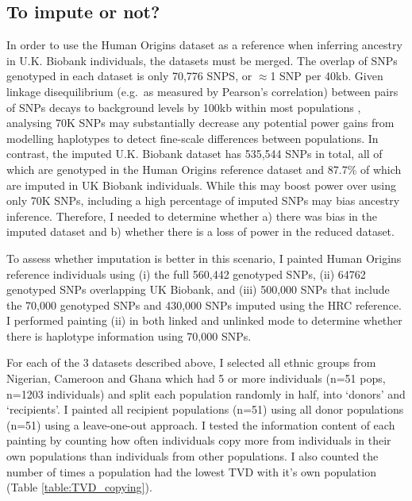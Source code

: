 
\subsection{To impute or not?}

In order to use the Human Origins dataset as a reference when inferring ancestry in U.K. Biobank individuals, the datasets must be merged. The overlap of SNPs genotyped in each dataset is only 70,776 SNPS, or $\approx$1 SNP per 40kb. Given linkage disequilibrium (e.g.\ as measured by Pearson's correlation) between pairs of SNPs decays to background levels by 100kb within most populations \cite{bosch2009decay}, analysing 70K SNPs may substantially decrease any potential power gains from modelling haplotypes to detect fine-scale differences between populations. In contrast, the imputed U.K. Biobank dataset has 535,544 SNPs in total, all of which are genotyped in the Human Origins reference dataset and 87.7\% of which are imputed in UK Biobank individuals. While this may boost power over using only 70K SNPs, including a high percentage of imputed SNPs may bias ancestry inference. Therefore, I needed to determine whether a) there was bias in the imputed dataset and b) whether there is a loss of power in the reduced dataset.

To assess whether imputation is better in this scenario, I painted Human Origins reference individuals using (i) the full 560,442 genotyped SNPs, (ii) 64762 genotyped SNPs overlapping UK Biobank, and (iii) 500,000 SNPs that include the 70,000 genotyped SNPs and 430,000 SNPs imputed using the HRC reference. I performed painting (ii) in both linked and unlinked mode to determine whether there is haplotype information using 70,000 SNPs.

For each of the 3 datasets described above, I selected all ethnic groups from Nigerian, Cameroon and Ghana which had 5 or more individuals (n=51 pops, n=1203 individuals) and split each population randomly in half, into `donors' and `recipients'. I painted all recipient populations (n=51) using all donor populations (n=51) using a leave-one-out approach. I tested the information content of each painting by counting how often individuals copy more from 
individuals in their own populations than individuals from other populations. I also counted the number of times a population had the lowest TVD with it's own population (Table \ref{table:TVD_copying}).

